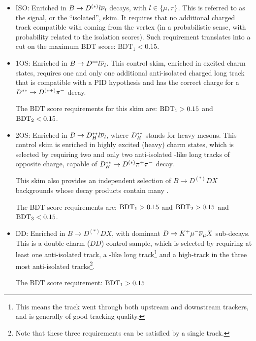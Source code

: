 \begin{itemize}
    \item ISO:
        Enriched in
        $B \rightarrow D^{(*)} {l} {{\overline{\nu}}_l}$ decays,
        with ${l} \in \{{\mu}, {\tau}\}$.
        This is referred to as the signal, or the ``isolated'', skim.
        It requires that no additional charged track compatible with coming from
        the \B vertex
        (in a probabilistic sense, with probability related to the isolation
        scores).
        Such requirement translates into a cut on the maximum BDT score:
        $\text{BDT}_1 < 0.15$.

    \item 1OS:
        Enriched in $B \rightarrow D^{**} {l} {{\overline{\nu}}_l}$.
        This control skim, enriched in excited charm states,
        requires one and only one additional anti-isolated charged long track
        that is compatible with a \pion PID hypothesis and has the correct
        charge for a $D^{**} \rightarrow D^{(*+)}{{\pi}^-}$ decay.

        The BDT score requirements for this skim are:
        $\text{BDT}_1 > 0.15$ and $\text{BDT}_2 < 0.15$.

    \item 2OS:
        Enriched in $B \rightarrow D^{**}_H {l} {{\overline{\nu}}_l}$,
        where $D^{**}_H$ stands for heavy \Dstst mesons.
        This control skim is enriched in highly excited (heavy) charm states,
        which is selected by requiring two and only two anti-isolated \pion-like
        long tracks of opposite charge,
        capable of $D^{**}_H \rightarrow D^{(*)} {{\pi}^+}{{\pi}^-}$ decay.

        This skim also provides an independent selection of
        $B \rightarrow D^{(*)}D X$ backgrounds
        whose decay products contain many \pion.

        The BDT score requirements are:
        $\text{BDT}_1 > 0.15$ and $\text{BDT}_2 > 0.15$ and
        $\text{BDT}_3 < 0.15$.

    \item DD:
        Enriched in $B \rightarrow D^{(*)}D X$,
        with dominant
        $D \rightarrow {\ensuremath{{K}^+}} {\ensuremath{\mu^-}} {\ensuremath{{\overline{\nu}}_\mu}} X$ sub-decays.
        This is a double-charm ($DD$) control sample,
        which is selected by requiring at least one anti-isolated track,
        a \kaon-like long track\footnote{
            This means the track went through both upstream and downstream
            trackers, and is generally of good tracking quality.
        } and a high-\pt track in the three most anti-isolated tracks\footnote{
            Note that these three requirements can be satisfied by a single
            track.
        }.

        The BDT score requirement:
        $\text{BDT}_1 > 0.15$
\end{itemize}


